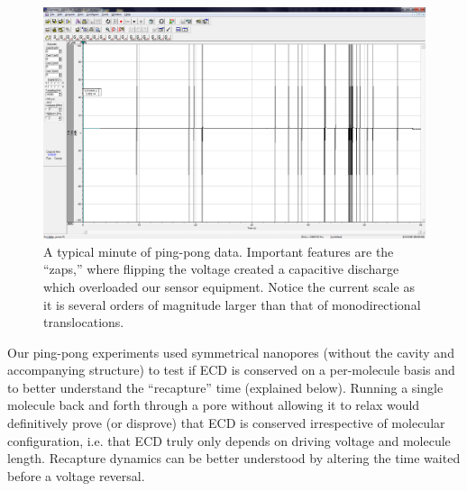 \documentclass[aps,prl,preprint,groupedaddress]{revtex4}
\begin{document}
\begin{figure}[h]
\centering
\includegraphics[width=1\textwidth]{figures/ping-pong-minute}
\caption{A typical minute of ping-pong data.
Important features are the ``zaps,'' where flipping the voltage created a capacitive discharge which overloaded our sensor equipment.
Notice the current scale as it is several orders of magnitude larger than that of monodirectional translocations.}
\label{fig:ping-pong-data}
\end{figure}

Our ping-pong experiments used symmetrical nanopores (without the cavity and accompanying structure) to test if ECD is conserved on a per-molecule basis and to better understand the ``recapture'' time (explained below).
Running a single molecule back and forth through a pore without allowing it to relax would definitively prove (or disprove) that ECD is conserved irrespective of molecular configuration, i.e. that ECD truly only depends on driving voltage and molecule length. Recapture dynamics can be better understood by altering the time waited before a voltage reversal.
\end{document}
